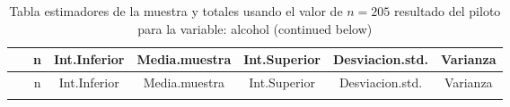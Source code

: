 \documentclass[
]{article}
\begin{document}
\begin{longtable}[]{@{}ccccccc@{}}
\caption{Tabla estimadores de la muestra y totales usando el valor de
\(n = 205\) resultado del piloto para la variable: alcohol (continued
below)}\tabularnewline
\toprule
\begin{minipage}[b]{0.20\columnwidth}\centering
~\strut
\end{minipage} & \begin{minipage}[b]{0.04\columnwidth}\centering
n\strut
\end{minipage} & \begin{minipage}[b]{0.11\columnwidth}\centering
Int.Inferior\strut
\end{minipage} & \begin{minipage}[b]{0.12\columnwidth}\centering
Media.muestra\strut
\end{minipage} & \begin{minipage}[b]{0.11\columnwidth}\centering
Int.Superior\strut
\end{minipage} & \begin{minipage}[b]{0.13\columnwidth}\centering
Desviacion.std.\strut
\end{minipage} & \begin{minipage}[b]{0.09\columnwidth}\centering
Varianza\strut
\end{minipage}\tabularnewline
\midrule
\endfirsthead
\toprule
\begin{minipage}[b]{0.20\columnwidth}\centering
~\strut
\end{minipage} & \begin{minipage}[b]{0.04\columnwidth}\centering
n\strut
\end{minipage} & \begin{minipage}[b]{0.11\columnwidth}\centering
Int.Inferior\strut
\end{minipage} & \begin{minipage}[b]{0.12\columnwidth}\centering
Media.muestra\strut
\end{minipage} & \begin{minipage}[b]{0.11\columnwidth}\centering
Int.Superior\strut
\end{minipage} & \begin{minipage}[b]{0.13\columnwidth}\centering
Desviacion.std.\strut
\end{minipage} & \begin{minipage}[b]{0.09\columnwidth}\centering
Varianza\strut
\end{minipage}\tabularnewline
\midrule
\endhead
\begin{minipage}[t]{0.20\columnwidth}\centering

\end{minipage}
\end{longtable}
\end{document}
